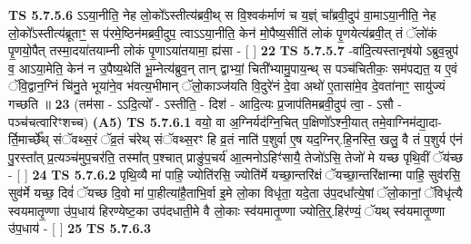 \documentclass[17pt]{extarticle}
\begin{document}
                  \newline
                                \textbf{ TS 5.7.5.6} \newline
                  ऽऽया॒नीति॒ नेह लो॒को᳚ऽस्तीत्य॑ब्रवी॒थ् स वि॒श्वक॑र्माणं च य॒ज्ञ्ं चा᳚ब्रवी॒दुप॑ वा॒माऽया॒नीति॒ नेह लो॒को᳚ऽस्तीत्य॑ब्रूताꣳ॒॒ स प॑रमे॒ष्ठिन॑मब्रवी॒दुप॒ त्वाऽऽया॒नीति॒ केन॑ मो॒पैष्य॒सीति॑ लोकं पृ॒णयेत्य॑ब्रवी॒त् तं ॅलो॑कं पृ॒णयो॒पैत् तस्मा॒दया॑तयाम्नी लोकं पृ॒णाऽया॑तयामा॒ ह्य॑सा - [  ] \textbf{  22} \newline
                  \newline
                                \textbf{ TS 5.7.5.7} \newline
                  -वा॑दि॒त्यस्तानृष॑यो ऽब्रुव॒न्नुप॑ व॒ आऽया॒मेति॒ केन॑ न उ॒पैष्य॒थेति॑ भू॒म्नेत्य॑ब्रुव॒न् तान् द्वाभ्यां॒ चिती᳚भ्यामु॒पाय॒न्थ् स पञ्च॑चितीकः॒ सम॑पद्यत॒ य ए॒वं ॅवि॒द्वान॒ग्निं चि॑नु॒ते भूया॑ने॒व भ॑वत्य॒भीमान् ॅलो॒काञ्ज॑यति वि॒दुरे॑नं दे॒वा अथो॑ ए॒तासा॑मे॒व दे॒वता॑नाꣳ॒॒ सायु॑ज्यं गच्छति ॥ \textbf{  23 } \newline
                  \newline
                       (तम॑सा - ऽऽदि॒त्यो᳚ - ऽस्तीति॒ - दिश॑ - आदि॒त्यः प्र॒जाप॑तिमब्रवी॒दुप॑ त्वा॒ - ऽसौ - पञ्च॑चत्वारिꣳशच्च)  \textbf{(A5)} \newline \newline
                                        \textbf{ TS 5.7.6.1} \newline
                  वयो॒ वा अ॒ग्निर्यद॑ग्नि॒चित् प॒क्षिणो᳚ऽश्नी॒यात् तमे॒वाग्निम॑द्या॒दा-र्ति॒मार्च्छे᳚थ् संॅवथ्स॒रं ॅव्र॒तं च॑रेथ् संॅवथ्स॒रꣳ हि व्र॒तं नाति॑ प॒शुर्वा ए॒ष यद॒ग्निर्.हि॒नस्ति॒ खलु॒ वै तं प॒शुर्य ए॑नं पु॒रस्ता᳚त् प्र॒त्यञ्च॑मुप॒चर॑ति॒ तस्मा᳚त् प॒श्चात् प्राङु॑प॒चर्य॑ आ॒त्मनोऽहिꣳ॑सायै॒ तेजो॑ऽसि॒ तेजो॑ मे यच्छ पृथि॒वीं ॅय॑च्छ - [  ] \textbf{  24} \newline
                  \newline
                                \textbf{ TS 5.7.6.2} \newline
                  पृथि॒व्यै मा॑ पाहि॒ ज्योति॑रसि॒ ज्योति॑र्मे यच्छा॒न्तरि॑क्षं ॅयच्छा॒न्तरि॑क्षान्मा पाहि॒ सुव॑रसि॒ सुव॑र्मे यच्छ॒ दिवं॑ ॅयच्छ दि॒वो मा॑ पा॒हीत्या॑है॒ताभि॒र्वा इ॒मे लो॒का विधृ॑ता॒ यदे॒ता उ॑प॒दधा᳚त्ये॒षां ॅलो॒कानां॒ ॅविधृ॑त्यै स्वयमातृ॒ण्णा उ॑प॒धाय॑ हिरण्येष्ट॒का उप॑दधाती॒मे वै लो॒काः स्व॑यमातृ॒ण्णा ज्योति॒र्॒.हिर॑ण्यं॒ ॅयथ् स्व॑यमातृ॒ण्णा उ॑प॒धाय॑ - [  ] \textbf{  25} \newline
                  \newline
                                \textbf{ TS 5.7.6.3} \newline
\end{document}
